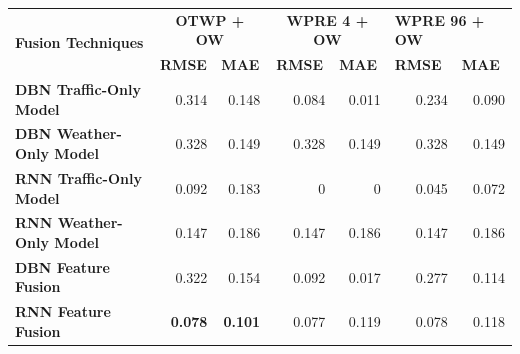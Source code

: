 \begin{table}[h]
\begin{tabular}{|l|r|r|r|r|r|r|}
\hline
\multirow{2}{*}{\textbf{Fusion Techniques}} & \multicolumn{2}{c|}{\textbf{OTWP + OW}}                                & \multicolumn{2}{c|}{\textbf{WPRE 4 + OW}}                              & \multicolumn{2}{l|}{\textbf{WPRE 96 + OW}}                             \\ \cline{2-7} 
                                            & \multicolumn{1}{c|}{\textbf{RMSE}} & \multicolumn{1}{l|}{\textbf{MAE}} & \multicolumn{1}{c|}{\textbf{RMSE}} & \multicolumn{1}{l|}{\textbf{MAE}} & \multicolumn{1}{l|}{\textbf{RMSE}} & \multicolumn{1}{l|}{\textbf{MAE}} \\ \hline
\textbf{DBN Traffic-Only Model}             & 0.314                              & 0.148                             & 0.084                              & 0.011                             & 0.234                              & 0.090                             \\ \hline
\textbf{DBN Weather-Only Model}             & 0.328                              & 0.149                             & 0.328                              & 0.149                             & 0.328                              & 0.149                             \\ \hline
\textbf{RNN Traffic-Only Model}             & 0.092                              & 0.183                             & 0                                  & 0                                 & 0.045                              & 0.072                             \\ \hline
\textbf{RNN Weather-Only Model}             & 0.147                              & 0.186                             & 0.147                              & 0.186                             & 0.147                              & 0.186                             \\ \hline
\textbf{DBN Feature Fusion}                 & 0.322                              & 0.154                             & 0.092                              & 0.017                             & 0.277                              & 0.114                             \\ \hline
\textbf{RNN Feature Fusion}                 & \textbf{0.078}                     & \textbf{0.101}                    & 0.077                              & 0.119                             & 0.078                              & 0.118                             \\ \hline

\end{tabular}
\end{table}
